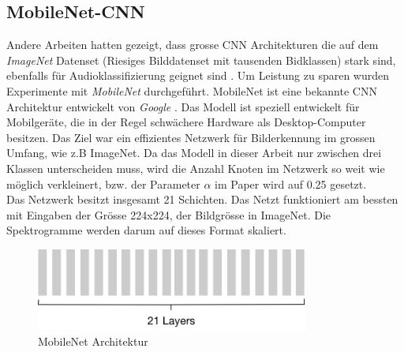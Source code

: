 \subsection{MobileNet-CNN}
Andere Arbeiten hatten gezeigt, dass grosse CNN Architekturen die auf dem \textit{ImageNet}\parencite{imagenet} Datenset (Riesiges Bilddatenset mit tausenden Bidklassen) stark sind, ebenfalls für Audioklassifizierung geignet sind \parencite{cnn_large}. Um Leistung zu sparen wurden Experimente mit \textit{MobileNet} durchgeführt.
MobileNet ist eine bekannte CNN Architektur entwickelt von \textit{Google} \parencite[][(V2)]{mobilenet}. Das Modell ist speziell entwickelt für Mobilgeräte, die in der Regel schwächere Hardware als Desktop-Computer besitzen. Das Ziel war ein effizientes Netzwerk für Bilderkennung im grossen Umfang, wie z.B ImageNet. Da das Modell in dieser Arbeit nur zwischen drei Klassen unterscheiden muss, wird die Anzahl Knoten im Netzwerk so weit wie möglich verkleinert, bzw. der Parameter $\alpha$ im Paper wird auf 0.25 gesetzt. 
\\
Das Netzwerk besitzt insgesamt 21 Schichten. Das Netzt funktioniert am bessten mit Eingaben der Grösse 224x224, der Bildgrösse in ImageNet. Die Spektrogramme werden darum auf dieses Format skaliert.
 \begin{figure}[hbt]
	\centering
		\includegraphics[width=0.8\textwidth]{assets/mobilenet.png}
	\caption{MobileNet Architektur}
	\label{img:mobilenet}
\end{figure}

